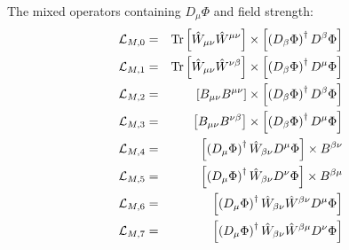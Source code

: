The mixed operators containing $D_\mu\Phi$ and field strength:
\begin{eqnarray}
 {\cal L}_{M,0} &=&   \hbox{Tr}\left [ \hat{W}_{\mu\nu} \hat{W}^{\mu\nu} \right ]
\times  \left [ \left ( D_\beta \Phi \right)^\dagger
D^\beta \Phi \right ]
\\
 {\cal L}_{M,1} &=&   \hbox{Tr}\left [ \hat{W}_{\mu\nu} \hat{W}^{\nu\beta} \right ]
\times  \left [ \left ( D_\beta \Phi \right)^\dagger
D^\mu \Phi \right ]
\\
 {\cal L}_{M,2} &=&   \left [ B_{\mu\nu} B^{\mu\nu} \right ]
\times  \left [ \left ( D_\beta \Phi \right)^\dagger
D^\beta \Phi \right ]
\\
 {\cal L}_{M,3} &=&   \left [ B_{\mu\nu} B^{\nu\beta} \right ]
\times  \left [ \left ( D_\beta \Phi \right)^\dagger
D^\mu \Phi \right ]
\\
  {\cal L}_{M,4} &=& \left [ \left ( D_\mu \Phi \right)^\dagger \hat{W}_{\beta\nu}
 D^\mu \Phi  \right ] \times B^{\beta\nu}
\\
  {\cal L}_{M,5} &=& \left [ \left ( D_\mu \Phi \right)^\dagger \hat{W}_{\beta\nu}
 D^\nu \Phi  \right ] \times B^{\beta\mu}
\\
  {\cal L}_{M,6} &=& \left [ \left ( D_\mu \Phi \right)^\dagger \hat{W}_{\beta\nu}
\hat{W}^{\beta\nu} D^\mu \Phi  \right ] 
\\
  {\cal L}_{M,7} &=& \left [ \left ( D_\mu \Phi \right)^\dagger \hat{W}_{\beta\nu}
\hat{W}^{\beta\mu} D^\nu \Phi  \right ] 
\end{eqnarray}



